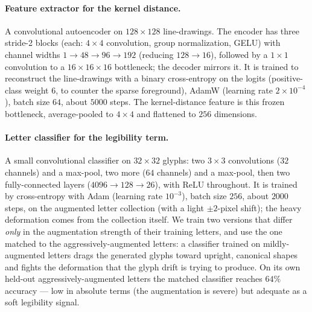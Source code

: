 \documentclass{article}
\begin{document}
\paragraph{Feature extractor for the kernel distance.} A convolutional autoencoder on $128{\times}128$
line-drawings. The encoder has three stride-2 blocks (each: $4{\times}4$ convolution, group
normalization, GELU) with channel widths $1\to48\to96\to192$ (reducing $128\to16$), followed by a
$1{\times}1$ convolution to a $16{\times}16{\times}16$ bottleneck; the decoder mirrors it. It is trained
to reconstruct the line-drawings with a binary cross-entropy on the logits (positive-class weight $6$,
to counter the sparse foreground), AdamW (learning rate $2{\times}10^{-4}$), batch size $64$, about
$5000$ steps. The kernel-distance feature is this frozen bottleneck, average-pooled to $4{\times}4$ and
flattened to $256$ dimensions.

\paragraph{Letter classifier for the legibility term.} A small convolutional classifier on
$32{\times}32$ glyphs: two $3{\times}3$ convolutions ($32$ channels) and a max-pool, two more
($64$ channels) and a max-pool, then two fully-connected layers ($4096\to128\to26$), with ReLU
throughout. It is trained by cross-entropy with Adam (learning rate $10^{-3}$), batch size $256$, about
$2000$ steps, on the augmented letter collection (with a light $\pm2$-pixel shift); the heavy
deformation comes from the collection itself. We train two versions that differ \emph{only} in the
augmentation strength of their training letters, and use the one matched to the aggressively-augmented
letters: a classifier trained on mildly-augmented letters drags the generated glyphs toward upright,
canonical shapes and fights the deformation that the glyph drift is trying to produce. On its own
held-out aggressively-augmented letters the matched classifier reaches $64\%$ accuracy --- low in
absolute terms (the augmentation is severe) but adequate as a soft legibility signal.
\end{document}

